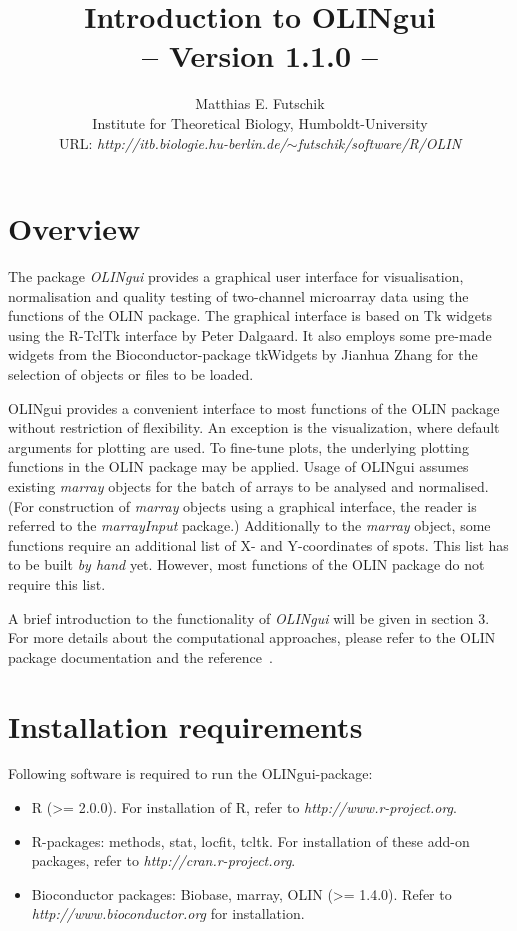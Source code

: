 \documentclass[a4paper,11pt]{article}
\title{Introduction to OLINgui \\ \large{-- Version 1.1.0 --} }
\author{Matthias E. Futschik\\ Institute for Theoretical Biology,  Humboldt-University\\ URL: \textit{http://itb.biologie.hu-berlin.de/$\sim$futschik/software/R/OLIN}}
\begin{document}
\maketitle
\tableofcontents

\section{Overview}
The package \emph{OLINgui} provides a graphical user interface for
visualisation, normalisation and quality testing of two-channel microarray data using the  functions of the OLIN package.  
The graphical interface is  based on Tk widgets using the R-TclTk interface by Peter Dalgaard. It also employs
some pre-made widgets from the Bioconductor-package tkWidgets  by Jianhua Zhang for
the selection of objects or files to be loaded. 

OLINgui provides a convenient interface to most functions of the OLIN package without restriction
of flexibility. An exception is the visualization, where default arguments for plotting 
are used. To fine-tune plots, the underlying plotting functions in the OLIN package
may be applied. Usage of OLINgui assumes existing \emph{marray} objects for the batch of arrays to 
be analysed and normalised.  (For construction of \emph{marray} objects using a graphical interface, the reader is referred
 to the \emph{marrayInput} package.) Additionally to the  \emph{marray} object, 
some functions require an additional list of X- and Y-coordinates of spots. 
This list  has to be built \emph{by hand} yet. However, most functions of the OLIN package 
 do not require this list.  

A brief introduction to the  functionality of \emph{OLINgui} will be given in section 3.
For more details about the computational approaches, please refer to the OLIN package documentation
and the reference~\cite{toni}. 


\section{Installation requirements}
Following software is required to run the OLINgui-package:
\begin{itemize} 
\item  R (>= 2.0.0). For installation of R, refer to \textit{http://www.r-project.org}.
\item  R-packages: methods, stat, locfit, tcltk. For installation of these add-on packages, refer to \textit{http://cran.r-project.org}.
\item Bioconductor packages: Biobase, marray, OLIN (>= 1.4.0). Refer to \textit{http://www.bioconductor.org} for installation. 
\end{itemize}
\end{document}
